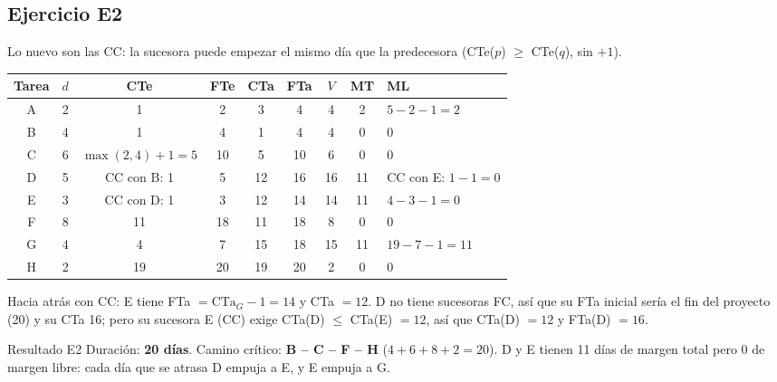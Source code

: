 \documentclass[11pt,a4paper]{article}
\begin{document}
\subsection*{Ejercicio E2}
Lo nuevo son las CC: la sucesora puede empezar el mismo día que la predecesora (CTe($p$) $\ge$ CTe($q$), sin $+1$).
\begin{center}\small
\begin{tabular}{ccccccccl}
\toprule
Tarea & $d$ & CTe & FTe & CTa & FTa & $V$ & MT & ML\\
\midrule
A & 2 & 1 & 2 & 3 & 4 & 4 & 2 & $5 - 2 - 1 = 2$\\
B & 4 & 1 & 4 & 1 & 4 & 4 & 0 & 0\\
C & 6 & $\max(2, 4) + 1 = 5$ & 10 & 5 & 10 & 6 & 0 & 0\\
D & 5 & CC con B: 1 & 5 & 12 & 16 & 16 & 11 & CC con E: $1 - 1 = 0$\\
E & 3 & CC con D: 1 & 3 & 12 & 14 & 14 & 11 & $4 - 3 - 1 = 0$\\
F & 8 & 11 & 18 & 11 & 18 & 8 & 0 & 0\\
G & 4 & 4 & 7 & 15 & 18 & 15 & 11 & $19 - 7 - 1 = 11$\\
H & 2 & 19 & 20 & 19 & 20 & 2 & 0 & 0\\
\bottomrule
\end{tabular}
\end{center}
Hacia atrás con CC: E tiene FTa $= \text{CTa}_G - 1 = 14$ y CTa $= 12$. D no tiene sucesoras FC, así que su FTa
inicial sería el fin del proyecto (20) y su CTa 16; pero su sucesora E (CC) exige CTa(D) $\le$ CTa(E) $= 12$, así
que CTa(D) $= 12$ y FTa(D) $= 16$.
\begin{resultado}{Resultado E2}
Duración: \textbf{20 días}. Camino crítico: \textbf{B -- C -- F -- H} ($4 + 6 + 8 + 2 = 20$). D y E tienen 11 días de
margen total pero 0 de margen libre: cada día que se atrasa D empuja a E, y E empuja a G.
\end{resultado}
\end{document}

